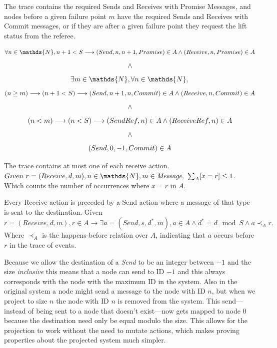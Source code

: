 \documentclass[runningheads]{llncs}
\newcommand{\happensbefore}{\prec_A}
\begin{document}
\begin{definition} The trace contains the required Sends and Receives with Promise Messages, and nodes before a given failure point $m$ have the required Sends and Receives with Commit messages, or if they are after a given failure point they request the lift status from the referee.

$$
   \forall n \in \mathds{N}, n + 1 < S \longrightarrow \\
   (Send, n, n+1, Promise) \in A \wedge (Receive, n, Promise) \in A\ \\
$$
$$ \wedge \\ $$
$$
   \exists m \in \mathds{N}, \forall n \in \mathds{N}, \\
$$
$$
   (n \ge m) \longrightarrow (n + 1 < S) \longrightarrow \\
   (Send, n+1, n, Commit) \in A \wedge (Receive, n, Commit) \in A\ \\
$$
$$ \wedge \\ $$
$$
   (n < m) \longrightarrow (n < S) \longrightarrow \\
   (SendRef, n) \in A \wedge (ReceiveRef, n) \in A\ \\
$$
$$ \wedge \\ $$
$$
    (Send, 0, -1, Commit) \in A \\
$$
\end{definition}

\begin{definition}
The trace contains at most one of each receive action. 
$Given\ r = (Receive, d, m), n \in \mathds{N}, m \in \emph{Message},\ \sum_{A}[x=r] \le 1$. Which counts the number of occurrences where $x=r$ in $A$. 
\end{definition}

\begin{definition}
Every Receive action is preceded by a Send action where a message of that type is sent to the destination. Given $r = (Receive, d, m), r \in A \longrightarrow \exists a = (Send, s, d^*, m), a \in A \wedge d^* = d \mod S \wedge a \happensbefore r.$ Where $\happensbefore$ is the happens-before relation over $A$, indicating that $a$ occurs before $r$ in the trace of events. 
\end{definition}

Because we allow the destination of a \emph{Send} to be an integer between $-1$ and the size \emph{inclusive} this means that a node can send to ID $-1$ and this always corresponds with the node with the maximum ID in the system. Also in the original system a node might send a message to the node with ID $n$, but when we project to size $n$ the node with ID $n$ is removed from the system. This send---instead of being sent to a node that doesn't exist---now gets mapped to node $0$ because the destination need only be equal modulo the size. This allows for the projection to work without the need to mutate actions, which makes proving properties about the projected system much simpler.  
\end{document}

